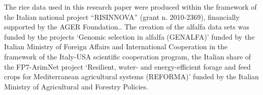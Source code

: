  
\makeatletter{}\begin{acknowledgements}
The rice data used in this research paper were produced within the framework of the Italian national project ``RISINNOVA'' (grant n. 2010-2369), financially supported by the AGER Foundation..
The creation of the alfalfa data sets was funded by the projects ‘Genomic selection in alfalfa (GENALFA)’ funded by the Italian Ministry of Foreign Affairs and International Cooperation in the framework of the Italy-USA scientific cooperation program, the Italian share of the FP7-ArimNet project ‘Resilient, water- and energy-efficient forage and feed crops for Mediterranean agricultural systems (REFORMA)’ funded by the Italian Ministry of Agricultural and Forestry Policies.
\end{acknowledgements}


 

      
   



